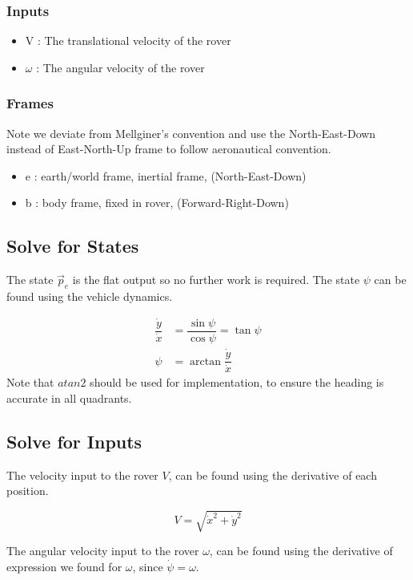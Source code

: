 \documentclass[10pt]{book}
\begin{document}
\subsubsection*{Inputs}
\begin{itemize}
    \item V : The translational velocity of the rover
    \item $\omega$ : The angular velocity of the rover
\end{itemize}

\subsubsection*{Frames}

Note we deviate from Mellginer's convention and use the North-East-Down instead of
East-North-Up frame to follow aeronautical convention.

\begin{itemize}
    \item e : earth/world frame, inertial frame, (North-East-Down)
    \item b : body frame, fixed in rover, (Forward-Right-Down)
\end{itemize}

\subsection{Solve for States}

The state $\vec{p}_e$ is the flat output so no further work is required.
The state $\psi$ can be found using the vehicle dynamics.

\begin{align*}
\dfrac{\dot{y}}{\dot{x}} &= \dfrac{\sin{\psi}}{\cos{\psi}} = \tan{\psi} \\
\psi &= \arctan{\dfrac{\dot{y}}{\dot{x}}}
\end{align*}
%
Note that $atan2$ should be used for implementation, to ensure the heading
is accurate in all quadrants.

\subsection{Solve for Inputs}

The velocity input to the rover $V$, can be found using the derivative of each position.

$$V = \sqrt{\dot{x}^2 + \dot{y}^2}$$

The angular velocity input to the rover $\omega$, can be found using the derivative of
expression we found for $\omega$, since $\dot{\psi} = \omega$.
\end{document}
